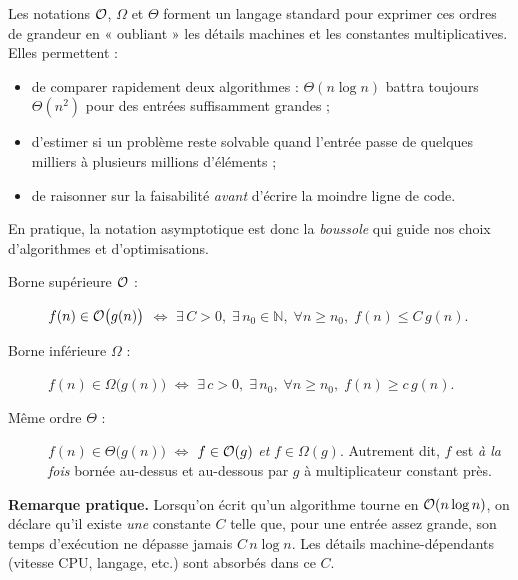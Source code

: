 Les notations $\mathcal{O}$, $\Omega$ et $\Theta$ forment un langage standard pour
exprimer ces ordres de grandeur en « oubliant » les détails machines et les
constantes multiplicatives.  Elles permettent :
\begin{itemize}
  \item de comparer rapidement deux algorithmes : $\Theta(n\log n)$ battra
        toujours $\Theta(n^{2})$ pour des entrées suffisamment grandes ;
  \item d’estimer si un problème reste solvable quand l’entrée passe
        de quelques milliers à plusieurs millions d’éléments ;
  \item de raisonner sur la faisabilité \emph{avant} d’écrire la moindre
        ligne de code.
\end{itemize}
En pratique, la notation asymptotique est donc la \emph{boussole} qui guide
nos choix d’algorithmes et d’optimisations.


\begin{description}
  \item[Borne supérieure $\mathcal{O}$ : ]
        \(f(n)\in\mathcal{O}\bigl(g(n)\bigr)\)
        \(\Longleftrightarrow\) \(\exists\,C>0,\;\exists\,n_{0}\in\mathbb N,\;
        \forall n\ge n_{0},\;f(n)\le C\,g(n).\)

  \item[Borne inférieure $\Omega$ : ]
        \(f(n)\in\Omega\bigl(g(n)\bigr)\)
        \(\Longleftrightarrow\) \(\exists\,c>0,\;\exists\,n_{0},\;
        \forall n\ge n_{0},\;f(n)\ge c\,g(n).\)

  \item[Même ordre $\Theta$ : ]
        \(f(n)\in\Theta\bigl(g(n)\bigr)\)
        \(\Longleftrightarrow\) \(f\in\mathcal{O}(g)\) \emph{et}
        \(f\in\Omega(g)\).
        Autrement dit, $f$ est \emph{à la fois} bornée au-dessus et au-dessous
        par $g$ à multiplicateur constant près.

\end{description}

\vspace{0.4em}
\noindent
\textbf{Remarque pratique.}  Lorsqu’on écrit qu’un algorithme tourne en
$\mathcal{O}(n\log n)$, on déclare qu’il existe \emph{une} constante $C$ telle que,
pour une entrée assez grande, son temps d’exécution ne dépasse jamais
$C\,n\log n$.  Les détails machine-dépendants (vitesse CPU, langage, etc.)
sont absorbés dans ce $C$.


